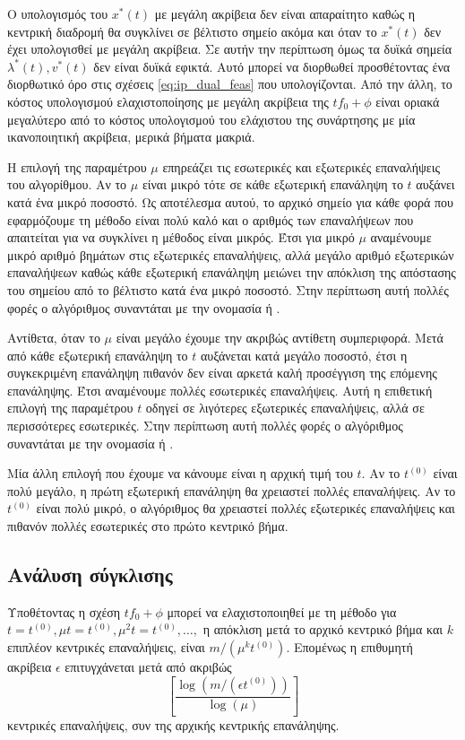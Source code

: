 Ο υπολογισμός του \( x^*(t) \) με μεγάλη ακρίβεια δεν είναι απαραίτητο καθώς η
κεντρική διαδρομή θα συγκλίνει σε βέλτιστο σημείο ακόμα και όταν το
\( x^*(t) \) δεν έχει υπολογισθεί με μεγάλη ακρίβεια. Σε αυτήν την περίπτωση
όμως τα δυϊκά σημεία \( \lambda^*(t), v^*(t) \) δεν είναι δυϊκά εφικτά. Αυτό
μπορεί να διορθωθεί προσθέτοντας ένα διορθωτικό όρο στις σχέσεις
\eqref{eq:ip_dual_feas} που υπολογίζονται. Από την άλλη, το κόστος υπολογισμού
ελαχιστοποίησης με μεγάλη ακρίβεια της \( tf_0 + \phi \) είναι οριακά μεγαλύτερο
από το κόστος υπολογισμού του ελάχιστου της συνάρτησης με μία ικανοποιητική
ακρίβεια, μερικά  βήματα μακριά.

Η επιλογή της παραμέτρου \( \mu \) επηρεάζει τις εσωτερικές και εξωτερικές
επαναλήψεις του αλγορίθμου. Αν το \( \mu \) είναι μικρό τότε σε κάθε εξωτερική
επανάληψη το \(t\) αυξάνει κατά ένα μικρό ποσοστό. Ως αποτέλεσμα αυτού, το
αρχικό σημείο για κάθε φορά που εφαρμόζουμε τη μέθοδο  είναι πολύ
καλό και ο αριθμός των επαναλήψεων που απαιτείται για να συγκλίνει η μέθοδος
 είναι μικρός. Έτσι για μικρό \( \mu \) αναμένουμε μικρό αριθμό
βημάτων  στις εξωτερικές επαναλήψεις, αλλά μεγάλο αριθμό εξωτερικών
επαναλήψεων καθώς κάθε εξωτερική επανάληψη μειώνει την απόκλιση της απόστασης
του σημείου από το βέλτιστο κατά ένα μικρό ποσοστό. Στην περίπτωση αυτή πολλές
φορές ο αλγόριθμος συναντάται με την ονομασία  ή
.

Αντίθετα, όταν το \( \mu \) είναι μεγάλο έχουμε την ακριβώς αντίθετη
συμπεριφορά. Μετά από κάθε εξωτερική επανάληψη το \(t\) αυξάνεται κατά μεγάλο
ποσοστό, έτσι η συγκεκριμένη επανάληψη πιθανόν δεν είναι αρκετά καλή προσέγγιση
της επόμενης επανάληψης. Έτσι αναμένουμε πολλές εσωτερικές επαναλήψεις. Αυτή η
επιθετική επιλογή της παραμέτρου \( t\) οδηγεί σε λιγότερες εξωτερικές
επαναλήψεις, αλλά σε περισσότερες εσωτερικές. Στην περίπτωση αυτή πολλές
φορές ο αλγόριθμος συναντάται με την ονομασία  ή
.

Μία άλλη επιλογή που έχουμε να κάνουμε είναι η αρχική τιμή του \(t\). Αν το
\(t^{(0)}\) είναι πολύ μεγάλο, η πρώτη εξωτερική επανάληψη θα χρειαστεί πολλές
επαναλήψεις. Αν το \(t^{(0)}\) είναι πολύ μικρό, ο αλγόριθμος θα χρειαστεί
πολλές εξωτερικές επαναλήψεις και πιθανόν πολλές εσωτερικές στο πρώτο κεντρικό
βήμα.

\subsection{Ανάλυση σύγκλισης}
Υποθέτοντας η σχέση \( tf_0 + \phi \) μπορεί να ελαχιστοποιηθεί με τη μέθοδο
 για \( t = t^{(0)}, \mu t = t^{(0)}, \mu^2 t = t^{(0)}, \dots, \)
η απόκλιση μετά το αρχικό κεντρικό βήμα και \(k\) επιπλέον κεντρικές
επαναλήψεις, είναι \( m / (\mu^kt^{(0)}) \). Επομένως η επιθυμητή ακρίβεια
\(\epsilon\) επιτυγχάνεται μετά από ακριβώς
\begin{equation*}
    \left[ \dfrac{\log{(m / (\epsilon t^{(0)}))}} { \log{(\mu)}} \right]
\end{equation*}
κεντρικές επαναλήψεις, συν της αρχικής κεντρικής επανάληψης.

